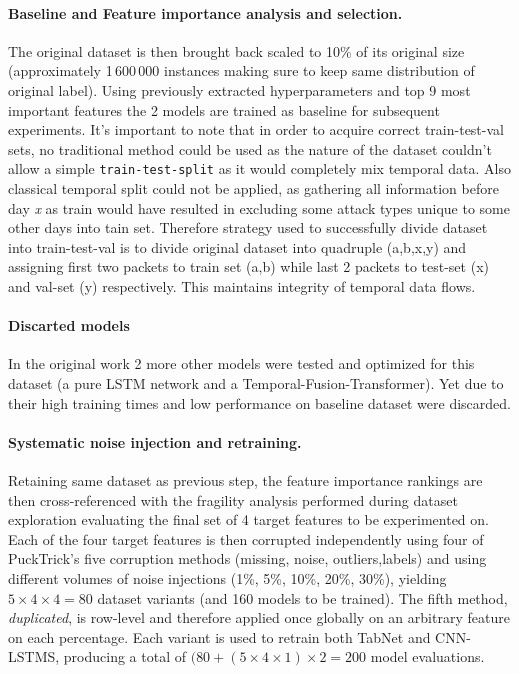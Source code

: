\documentclass{article}
\begin{document}
\paragraph{Baseline and Feature importance analysis and selection.}
    The original dataset is then brought back scaled to 10\% of its original size (approximately
    1\,600\,000 instances making sure to keep same distribution of original label). Using previously extracted hyperparameters and top 9 most important features the 2 models are trained as baseline for subsequent experiments. It's important to note that in order to acquire correct train-test-val sets, no traditional method could be used as the nature of the dataset couldn't allow a simple \texttt{train-test-split} as it would completely mix temporal data. Also classical temporal split could not be applied, as gathering all information before day \emph{x} as train would have resulted in excluding some attack types unique to some other days into tain set. Therefore strategy used to successfully divide dataset into train-test-val is to divide original dataset into quadruple (a,b,x,y) and assigning first two packets to train set (a,b) while last 2 packets to test-set (x) and val-set (y) respectively. This maintains integrity of temporal data flows.

\paragraph{Discarted models}
    In the original work 2 more other models were tested and optimized for this dataset (a pure LSTM network and a Temporal-Fusion-Transformer). Yet due to their high training times and low performance on baseline dataset were discarded. 

\paragraph{Systematic noise injection and retraining.}
  Retaining same dataset as previous step, the feature importance rankings are then cross-referenced with the
fragility analysis performed during dataset exploration evaluating the final set of 4 target features to be experimented on. Each of the four target features is then corrupted independently using four of PuckTrick's five corruption methods (missing, noise, outliers,labels) and using different volumes of noise injections (1\%, 5\%, 10\%, 20\%, 30\%), yielding $5 \times 4 \times 4 = 80$ dataset variants (and 160 models to be trained).  The fifth method, \emph{duplicated}, is row-level and therefore applied
  once globally on an arbitrary feature on each percentage.  Each variant is used to
  retrain both TabNet and CNN-LSTMS, producing a total of $(80 + (5 \times 4 \times 1) \times 2 = 200$ model evaluations.
  
\end{document}
